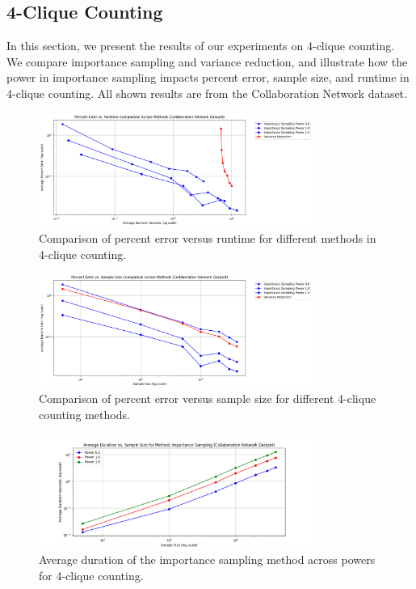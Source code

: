 \documentclass[11pt]{article}
\begin{document}
\subsection{4-Clique Counting}

In this section, we present the results of our experiments on 4-clique counting.
We compare importance sampling and variance reduction, and illustrate how the power in importance sampling impacts percent error, sample size, and runtime in 4-clique counting.
All shown results are from the Collaboration Network dataset.

\begin{figure}[H]
    \centering
    \includegraphics[width=0.8\textwidth]{plots/4-clique/comparison/percent_error_vs_runtime_comparison.png}
    \caption{Comparison of percent error versus runtime for different methods in 4-clique counting.}
    \label{fig:4_clique_percent_error_runtime_comparison}
\end{figure}

\begin{figure}[H]
    \centering
    \includegraphics[width=0.8\textwidth]{plots/4-clique/comparison/percent_error_vs_sample_size_comparison.png}
    \caption{Comparison of percent error versus sample size for different 4-clique counting methods.}
    \label{fig:4_clique_percent_error_sample_size_comparison}
\end{figure}

\begin{figure}[H]
    \centering
    \includegraphics[width=0.8\textwidth]{plots/4-clique/importance-sampling/avg_duration_Importance Sampling.png}
    \caption{Average duration of the importance sampling method across powers for 4-clique counting.}
    \label{fig:4_clique_avg_duration_importance_sampling}
\end{figure}
\end{document}
